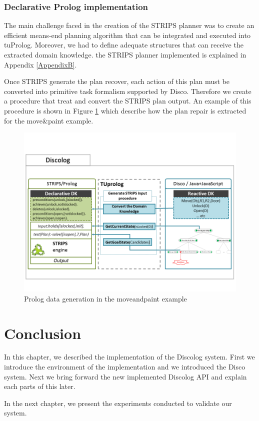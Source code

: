 \subsubsection{ Declarative Prolog implementation }
The main challenge faced in the creation of the STRIPS planner was to create an efficient means-end planning algorithm that can be integrated and executed  into tuProlog. Moreover, we had to define adequate structures that can receive the extracted domain knowledge. the STRIPS planner implemented is explained in Appendix \ref{AppendixB}.


 Once STRIPS generate the plan recover, each action of this plan must be converted into primitive task formalism supported by Disco. Therefore we create a procedure that treat and convert the STRIPS plan output. An example of this procedure is shown  in Figure \ref{output} which describe how the plan repair is extracted for the move\&paint example. 

	\begin{figure}[!h]
		\centering
		\includegraphics[width=\textwidth]{Pictures/output1.png}
		\caption{\label{output} Prolog data generation in the moveandpaint example}
	\end{figure}

\section{Conclusion}
In this chapter, we described the implementation of the Discolog system. First we introduce the environment of the implementation and we introduced the Disco system. Next we bring forward the new implemented Discolog API and explain each parts of this later.

In the next chapter, we present the experiments conducted to validate our system. 



%
%
